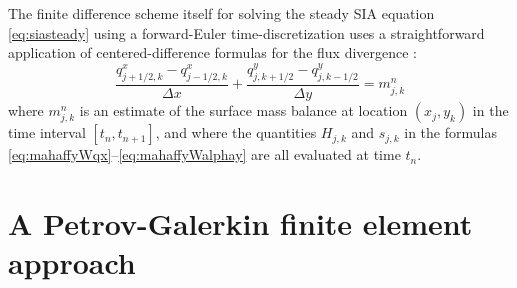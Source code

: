 \documentclass[11pt]{amsart}
\begin{document}
The finite difference scheme itself for solving the steady SIA equation \eqref{eq:siasteady} using a forward-Euler time-discretization uses a straightforward application of centered-difference formulas for the flux divergence \cite{MortonMayers2005}:
\begin{equation}
\frac{q^x_{j+1/2,k} - q^x_{j-1/2,k}}{\Delta x} + \frac{q^y_{j,k+1/2}- q^y_{j,k-1/2}}{\Delta y} = m_{j,k}^n
\end{equation}
where $m_{j,k}^n$ is an estimate of the surface mass balance at location $(x_j,y_k)$ in the time interval $[t_n,t_{n+1}]$, and where the quantities $H_{j,k}$ and $s_{j,k}$ in the formulas \eqref{eq:mahaffyWqx}--\eqref{eq:mahaffyWalphay} are all evaluated at time $t_n$.


\section{A Petrov-Galerkin finite element approach}







\begin{comment}
Here is what the MPAS Land-Ice User's Manual version 3.0 says:

\begin{quote}
\small
Velocities and fluxes are calculated on the midpoint of Voronoi cell edges.  The normal component of surface slope is calculated on cell edges using surface elevation at adjacent cell centers.  The tangential component of surface slope is calculated on cell edges using surface elevation at adjacent vertices. The surface elevation at vertices is calculated from the values at adjacent cell centers using barycentric interpolation. Ice thickness on edges is calculated as the average of the adjacent cell center values (2nd-order approximation).
\end{quote}

Looking at this, and the code, I don't think they think of it as Petrov-Galerkin
\end{comment}
\end{document}

